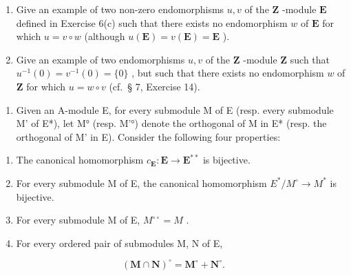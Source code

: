 \begin{enumerate}
\def\labelenumi{(\alph{enumi})}
\setcounter{enumi}{1}
\item
  Give an example of two non-zero endomorphisms \(u, v\) of the \(\mathbf{Z}\) -module \(\mathbf{E}\) defined in Exercise 6(c) such that there exists no endomorphism \(w\) of \(\mathbf{E}\) for which \(u = v \circ w\) (although \(u(\mathbf{E}) = v(\mathbf{E}) = \mathbf{E}\) ).
\item
  Give an example of two endomorphisms \(u, v\) of the \(\mathbf{Z}\) -module \(\mathbf{Z}\) such that \(u^{-1}(0) = v^{-1}(0) = \{0\}\) , but such that there exists no endomorphism \(w\) of \(\mathbf{Z}\) for which \(u = w \circ v\) (cf.~§ 7, Exercise 14).
\end{enumerate}

\begin{enumerate}
\def\labelenumi{\arabic{enumi}.}
\setcounter{enumi}{8}
\tightlist
\item
  Given an A-module E, for every submodule M of E (resp. every submodule M' of E*), let M° (resp. M'°) denote the orthogonal of M in E* (resp. the orthogonal of M' in E). Consider the following four properties:
\end{enumerate}

\begin{enumerate}
\def\labelenumi{(\Alph{enumi})}
\item
  The canonical homomorphism \(c_{\mathbf{E}}: \mathbf{E} \to \mathbf{E}^{**}\) is bijective.
\item
  For every submodule M of E, the canonical homomorphism \(E^{*}/M^{\circ} \rightarrow M^{*}\) is bijective.
\item
  For every submodule M of E, \(M^{\circ\circ} = M\) .
\item
  For every ordered pair of submodules M, N of E,
\end{enumerate}

\[
(\mathbf {M} \cap \mathbf {N}) ^ {\circ} = \mathbf {M} ^ {\circ} + \mathbf {N} ^ {\circ}.
\]

